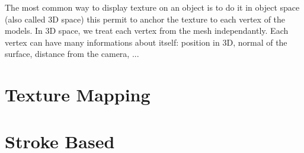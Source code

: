 The most common way to display texture on an object is to do it in object space (also called 3D space) this permit to anchor the texture to each vertex of the models.
In 3D space, we treat each vertex from the mesh independantly. Each vertex can have many informations about itself: position in 3D, normal of the surface, distance from the camera, ...


\section{Texture Mapping}

\section{Stroke Based}
